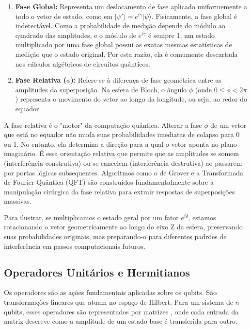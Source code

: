 \documentclass[12pt, a4paper]{article}
\newcommand{\ket}[1]{\lvert #1 \rangle}
\begin{document}
\begin{enumerate}
    \item \textbf{Fase Global:} Representa um deslocamento de fase aplicado uniformemente a todo o vetor de estado, como em $\ket{\psi'} = e^{i\gamma}\ket{\psi}$. Fisicamente, a fase global é indetectável. Como a probabilidade de medição depende do módulo ao quadrado das amplitudes, e o módulo de $e^{i\gamma}$ é sempre 1, um estado multiplicado por uma fase global possui as exatas mesmas estatísticas de medição que o estado original. Por esta razão, ela é comumente descartada nos cálculos algébricos de circuitos quânticos. 

    \item \textbf{Fase Relativa ($\phi$):} Refere-se à diferença de fase geométrica entre as amplitudes da superposição. Na esfera de Bloch, o ângulo $\phi$ (onde $0 \le \phi < 2\pi$) representa o movimento do vetor ao longo da longitude, ou seja, ao redor do equador. 
\end{enumerate}

A fase relativa é o "motor" da computação quântica. Alterar a fase $\phi$ de um vetor que está no equador não muda suas probabilidades imediatas de colapso para 0 ou 1. No entanto, ela determina a direção para a qual o vetor aponta no plano imaginário. É essa orientação relativa que permite que as amplitudes se somem (interferência construtiva) ou se cancelem (interferência destrutiva) ao passarem por portas lógicas subsequentes. Algoritmos como o de Grover e a Transformada de Fourier Quântica (QFT) são construídos fundamentalmente sobre a manipulação cirúrgica da fase relativa para extrair respostas de superposições massivas.

Para ilustrar, se multiplicamos o estado geral por um fator $e^{i\delta}$, estamos rotacionando o vetor geometricamente ao longo do eixo Z da esfera, preservando suas probabilidades originais, mas preparando-o para diferentes padrões de interferência em passos computacionais futuros.

\subsection{Operadores Unitários e Hermitianos}
Os operadores são as ações fundamentais aplicadas sobre os qubits. São transformações lineares que atuam no espaço de Hilbert. Para um sistema de $n$ qubits, esses operadores são representados por matrizes%
, onde cada entrada da matriz descreve como a amplitude de um estado base é transferida para outro.
\end{document}
